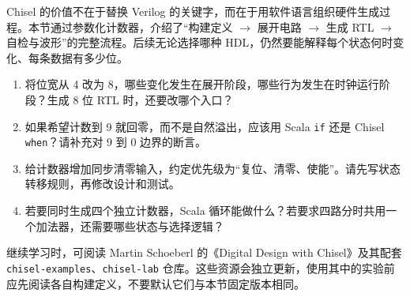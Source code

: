 Chisel 的价值不在于替换 Verilog 的关键字，而在于用软件语言组织硬件生成过程。本节通过参数化计数器，介绍了“构建定义 $\rightarrow$ 展开电路 $\rightarrow$ 生成 RTL $\rightarrow$ 自检与波形”的完整流程。后续无论选择哪种 HDL，仍然要能解释每个状态何时变化、每条数据有多少位。

\begin{enumerate}
  \item 将位宽从 4 改为 8，哪些变化发生在展开阶段，哪些行为发生在时钟运行阶段？生成 8 位 RTL 时，还要改哪个入口？
  \item 如果希望计数到 9 就回零，而不是自然溢出，应该用 Scala \texttt{if} 还是 Chisel \texttt{when}？请补充对 9 到 0 边界的断言。
  \item 给计数器增加同步清零输入，约定优先级为“复位、清零、使能”。请先写状态转移规则，再修改设计和测试。
  \item 若要同时生成四个独立计数器，Scala 循环能做什么？若要求四路分时共用一个加法器，还需要哪些状态与选择逻辑？
\end{enumerate}

继续学习时，可阅读 Martin Schoeberl 的《Digital Design with Chisel》及其配套 \texttt{chisel-examples}、\texttt{chisel-lab} 仓库\citep{c02-chisel-book}。这些资源会独立更新，使用其中的实验前应先阅读各自构建定义，不要默认它们与本节固定版本相同。
